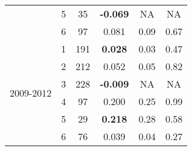 \begin{table}[htbp]
\begin{tabular}{rrrrrr}
    \multicolumn{1}{c}{} & \multicolumn{1}{c}{5} & \multicolumn{1}{c}{35} & \multicolumn{1}{c}{\textbf{-0.069 }} & \multicolumn{1}{c}{NA} & \multicolumn{1}{c}{NA} \\
    \multicolumn{1}{c}{} & \multicolumn{1}{c}{6} & \multicolumn{1}{c}{97} & \multicolumn{1}{c}{0.081 } & \multicolumn{1}{c}{0.09 } & \multicolumn{1}{c}{0.67 } \\\midrule
    \multicolumn{1}{c}{\multirow{6}[2]{*}{\begin{sideways}2009-2012\end{sideways}}} & \multicolumn{1}{c}{1} & \multicolumn{1}{c}{191} & \multicolumn{1}{c}{\textbf{0.028 }} & \multicolumn{1}{c}{0.03 } & \multicolumn{1}{c}{0.47 } \\
    \multicolumn{1}{c}{} & \multicolumn{1}{c}{2} & \multicolumn{1}{c}{212} & \multicolumn{1}{c}{0.052 } & \multicolumn{1}{c}{0.05 } & \multicolumn{1}{c}{0.82 } \\
    \multicolumn{1}{c}{} & \multicolumn{1}{c}{3} & \multicolumn{1}{c}{228} & \multicolumn{1}{c}{\textbf{-0.009 }} & \multicolumn{1}{c}{NA} & \multicolumn{1}{c}{NA} \\
    \multicolumn{1}{c}{} & \multicolumn{1}{c}{4} & \multicolumn{1}{c}{97} & \multicolumn{1}{c}{0.200 } & \multicolumn{1}{c}{0.25 } & \multicolumn{1}{c}{0.99 } \\
    \multicolumn{1}{c}{} & \multicolumn{1}{c}{5} & \multicolumn{1}{c}{29} & \multicolumn{1}{c}{\textbf{0.218 }} & \multicolumn{1}{c}{0.28 } & \multicolumn{1}{c}{0.58 } \\
    \multicolumn{1}{c}{} & \multicolumn{1}{c}{6} & \multicolumn{1}{c}{76} & \multicolumn{1}{c}{0.039 } & \multicolumn{1}{c}{0.04 } & \multicolumn{1}{c}{0.27 } \\
    \bottomrule
    \end{tabular}%
  \label{tab:pHTVPHPA}%
\end{table}%
